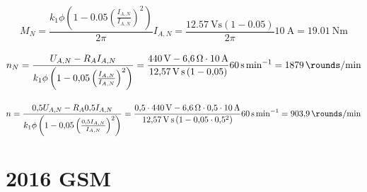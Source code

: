 \documentclass[11pt,a4paper]{scrartcl}
\newcommand{\mybr}[1]{\left(#1\right)}
\newcommand{\0}{_{\mybr{0}}}
\newcommand{\1}{_{\mybr{1}}}
\newcommand{\2}{_{\mybr{2}}}
\begin{document}
\subsection{}
\begin{equation}
M_N=\frac{k_1\phi\mybr{1-\num{0.05}\mybr{\frac{I_{A,N}}{I_{A,N}}}^2}}{2\pi}I_{A,N}=\frac{\SI{12.57}{\volt\second}\mybr{1-\num{0.05}}}{2\pi}\SI{10}{\ampere}=\SI{19.01}{\newton\metre}
\end{equation}

\subsection{}
\begin{equation}
n_N=\frac{U_{A,N}-R_A I_{A,N}}{k_1\phi\mybr{1-\num{0.05}\mybr{\frac{I_{A,N}}{I_{A,N}}}^2}}=\frac{\SI{440}{\volt}-\SI{6.6}{\ohm}\cdot\SI{10}{\ampere}}{\SI{12.57}{\volt\second}\mybr{1-\num{0.05}}}\SI{60}{\second\per\minute}=\SI{1879}{\rounds\per\minute}
\end{equation}

\subsection{}
\begin{equation}
n=\frac{\num{0.5}U_{A,N}-R_A\num{0.5} I_{A,N}}{k_1\phi\mybr{1-\num{0.05}\mybr{\frac{\num{0.5}I_{A,N}}{I_{A,N}}}^2}}=\frac{\num{0.5}\cdot\SI{440}{\volt}-\SI{6.6}{\ohm}\cdot\num{0.5}\cdot\SI{10}{\ampere}}{\SI{12.57}{\volt\second}\mybr{1-\num{0.05}\cdot\num{0.5}^2}}\SI{60}{\second\per\minute}=\SI{903.9}{\rounds\per\minute}
\end{equation}


\clearpage
\part{2016 GSM}
\section{}
\end{document}
